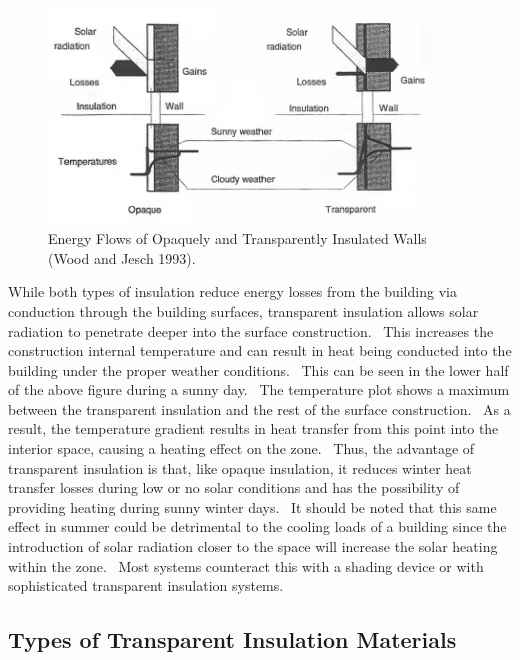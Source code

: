 \begin{figure}[hbtp] %
\centering
\includegraphics[width=0.9\textwidth, height=0.9\textheight, keepaspectratio=true]{media/image399.png}
\caption{Energy Flows of Opaquely and Transparently Insulated Walls (Wood and Jesch 1993). \protect \label{fig:energy-flows-of-opaquely-and-transparently}}
\end{figure}

While both types of insulation reduce energy losses from the building via conduction through the building surfaces, transparent insulation allows solar radiation to penetrate deeper into the surface construction.~ This increases the construction internal temperature and can result in heat being conducted into the building under the proper weather conditions.~ This can be seen in the lower half of the above figure during a sunny day.~ The temperature plot shows a maximum between the transparent insulation and the rest of the surface construction.~ As a result, the temperature gradient results in heat transfer from this point into the interior space, causing a heating effect on the zone.~ Thus, the advantage of transparent insulation is that, like opaque insulation, it reduces winter heat transfer losses during low or no solar conditions and has the possibility of providing heating during sunny winter days.~ It should be noted that this same effect in summer could be detrimental to the cooling loads of a building since the introduction of solar radiation closer to the space will increase the solar heating within the zone.~ Most systems counteract this with a shading device or with sophisticated transparent insulation systems.

\subsection{Types of Transparent Insulation Materials}\label{types-of-transparent-insulation-materials}

